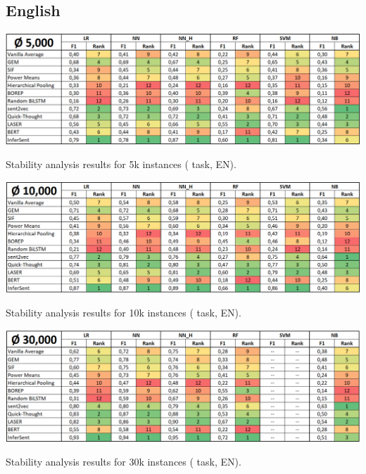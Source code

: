 \vspace*{-8mm}

\subsection{English}

\begin{table}[H]
	\centering
	\includegraphics[scale=0.475]{images/results_wc_en_5000}
	\caption[Stability analysis results for 5k instances ( task, EN)]
		{Stability analysis results for 5k instances ( task, EN).}
\end{table}

\begin{table}[H]
	\centering
	\includegraphics[scale=0.475]{images/results_wc_en_10000}
	\caption[Stability analysis results for 10k instances ( task, EN)]
		{Stability analysis results for 10k instances ( task, EN).}
\end{table}

\begin{table}[H]
	\centering
	\includegraphics[scale=0.475]{images/results_wc_en_30000}
	\caption[Stability analysis results for 30k instances ( task, EN)]
		{Stability analysis results for 30k instances ( task, EN).}
\end{table}

